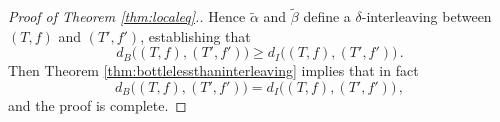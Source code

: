\documentclass[10pt,a4paper]{amsart}
\begin{document}
\begin{proof}[Proof of Theorem \ref{thm:localeq}.]
Hence $\widetilde\alpha$ and $\widetilde\beta$ define a $\delta$-interleaving between $(T,f)$ and $(T',f')$, establishing that
\begin{equation*}
    d_B\big((T,f),(T',f')\big) \geq d_I\big((T,f),(T',f')\big)\,.
\end{equation*}
Then Theorem \ref{thm:bottlelessthaninterleaving} implies that in fact
\begin{equation*}
    d_B\big((T,f),(T',f')\big) = d_I\big((T,f),(T',f')\big)\,,
\end{equation*}
and the proof is complete.
\end{proof}
\end{document}
